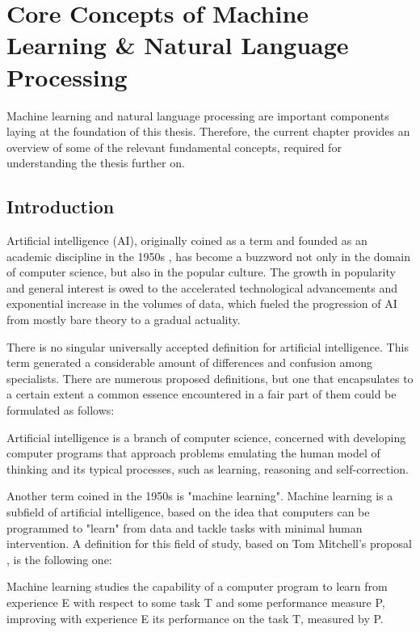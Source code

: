 \section{Core Concepts of Machine Learning \& Natural Language Processing}
Machine learning and natural language processing are important components laying at the foundation of this thesis. Therefore, the current chapter provides an overview of some of the relevant fundamental concepts, required for understanding the thesis further on.

\subsection{Introduction}

Artificial intelligence (AI), originally coined as a term and founded as an academic discipline in the 1950s \cite{a5}, has become a buzzword not only in the domain of computer science, but also in the popular culture. The growth in popularity and general interest is owed to the accelerated technological advancements and exponential increase in the volumes of data, which fueled the progression of AI from mostly bare theory to a gradual actuality.

There is no singular universally accepted definition for artificial intelligence. This term generated a considerable amount of differences and confusion among specialists\cite{a6}. There are numerous proposed definitions, but one that encapsulates to a certain extent a common essence encountered in a fair part of them could be formulated as follows:

\begin{definition}
  Artificial intelligence is a branch of computer science, concerned with developing computer programs that approach problems emulating the human model of thinking and its typical processes, such as learning, reasoning and self-correction.
\end{definition}

Another term coined in the 1950s is "machine learning". Machine learning is a subfield of artificial intelligence, based on the idea that computers can be programmed to "learn" from data and tackle tasks with minimal human intervention. A definition for this field of study, based on Tom Mitchell's proposal \cite{b1}, is the following one:

\begin{definition}
  Machine learning studies the capability of a computer program to learn from experience E with respect to some task T and some performance measure P, improving with experience E its performance on the task T, measured by P.
\end{definition}

